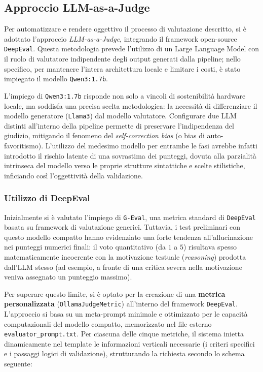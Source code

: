 \documentclass[11pt]{report}
\begin{document}
\subsection{Approccio LLM-as-a-Judge}
 
Per automatizzare e rendere oggettivo il processo di valutazione descritto, si è adottato l'approccio \textit{LLM-as-a-Judge}, integrando il framework open-source \texttt{DeepEval}. Questa metodologia prevede l'utilizzo di un Large Language Model con il ruolo di valutatore indipendente degli output generati dalla pipeline; nello specifico, per mantenere l'intera architettura locale e limitare i costi, è stato impiegato il modello \texttt{Qwen3:1.7b}.

L'impiego di \texttt{Qwen3:1.7b} risponde non solo a vincoli di sostenibilità hardware locale, ma soddisfa una precisa scelta metodologica: la necessità di differenziare il modello generatore (\texttt{Llama3}) dal modello valutatore. Configurare due LLM distinti all'interno della pipeline permette di preservare l'indipendenza del giudizio, mitigando il fenomeno del \textit{self-correction bias} (o bias di auto-favoritismo). L'utilizzo del medesimo modello per entrambe le fasi avrebbe infatti introdotto il rischio latente di una sovrastima dei punteggi, dovuta alla parzialità intrinseca del modello verso le proprie strutture sintattiche e scelte stilistiche, inficiando così l'oggettività della validazione.

\subsubsection*{Utilizzo di DeepEval}
Inizialmente si è valutato l'impiego di \texttt{G-Eval}, una metrica standard di \texttt{DeepEval} basata su framework di valutazione generici. Tuttavia, i test preliminari con questo modello compatto hanno evidenziato una forte tendenza all'allucinazione nei punteggi numerici finali: il voto quantitativo (da $1$ a $5$) risultava spesso matematicamente incoerente con la motivazione testuale (\textit{reasoning}) prodotta dall'LLM stesso (ad esempio, a fronte di una critica severa nella motivazione veniva assegnato un punteggio massimo).

Per superare questo limite, si è optato per la creazione di una \textbf{metrica personalizzata} (\texttt{OllamaJudgeMetric}) all'interno del framework \texttt{DeepEval}. L'approccio si basa su un meta-prompt minimale e ottimizzato per le capacità computazionali del modello compatto, memorizzato nel file esterno \texttt{evaluator\_prompt.txt}. Per ciascuna delle cinque metriche, il sistema inietta dinamicamente nel template le informazioni verticali necessarie (i criteri specifici e i passaggi logici di validazione), strutturando la richiesta secondo lo schema seguente:
\end{document}
